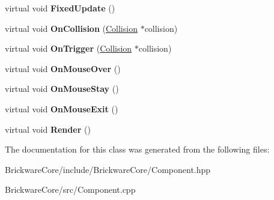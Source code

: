 \begin{DoxyCompactItemize}
\item 
\hypertarget{classBrickware_1_1Core_1_1Component_af2d0cb42dd585c9dce62c4d65a526f15}{}virtual void {\bfseries Fixed\+Update} ()\label{classBrickware_1_1Core_1_1Component_af2d0cb42dd585c9dce62c4d65a526f15}

\item 
\hypertarget{classBrickware_1_1Core_1_1Component_a23542d4949bce820b9006fa2bcd01d3a}{}virtual void {\bfseries On\+Collision} (\hyperlink{classBrickware_1_1Core_1_1Collision}{Collision} $\ast$collision)\label{classBrickware_1_1Core_1_1Component_a23542d4949bce820b9006fa2bcd01d3a}

\item 
\hypertarget{classBrickware_1_1Core_1_1Component_ae41b83e7ea583fdf7158fef2d43d14e3}{}virtual void {\bfseries On\+Trigger} (\hyperlink{classBrickware_1_1Core_1_1Collision}{Collision} $\ast$collision)\label{classBrickware_1_1Core_1_1Component_ae41b83e7ea583fdf7158fef2d43d14e3}

\item 
\hypertarget{classBrickware_1_1Core_1_1Component_a3631a86562a641d9e246529a6f0b3356}{}virtual void {\bfseries On\+Mouse\+Over} ()\label{classBrickware_1_1Core_1_1Component_a3631a86562a641d9e246529a6f0b3356}

\item 
\hypertarget{classBrickware_1_1Core_1_1Component_ac7ccd9515a3d3d1b751a139cd7e05443}{}virtual void {\bfseries On\+Mouse\+Stay} ()\label{classBrickware_1_1Core_1_1Component_ac7ccd9515a3d3d1b751a139cd7e05443}

\item 
\hypertarget{classBrickware_1_1Core_1_1Component_afc241d43d9ef5b637a0f5e985874956a}{}virtual void {\bfseries On\+Mouse\+Exit} ()\label{classBrickware_1_1Core_1_1Component_afc241d43d9ef5b637a0f5e985874956a}

\item 
\hypertarget{classBrickware_1_1Core_1_1Component_a22275746474021b2e1e36d4a58d48cfd}{}virtual void {\bfseries Render} ()\label{classBrickware_1_1Core_1_1Component_a22275746474021b2e1e36d4a58d48cfd}

\end{DoxyCompactItemize}


The documentation for this class was generated from the following files\+:\begin{DoxyCompactItemize}
\item 
Brickware\+Core/include/\+Brickware\+Core/Component.\+hpp\item 
Brickware\+Core/src/Component.\+cpp\end{DoxyCompactItemize}
